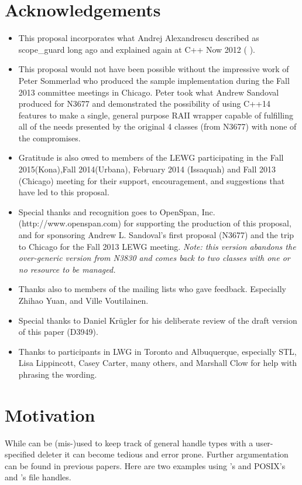 \documentclass[ebook,11pt,article]{memoir}
\begin{document}
\chapter{Acknowledgements}
\begin{itemize}
\item This proposal incorporates what Andrej Alexandrescu described as scope_guard long ago and explained again at C++ Now 2012 (%
).
\item This proposal would not have been possible without the impressive work of Peter Sommerlad who produced the sample implementation during the Fall 2013 committee meetings in Chicago.  Peter took what Andrew Sandoval produced for N3677 and demonstrated the possibility of using C++14 features to make a single, general purpose RAII wrapper capable of fulfilling all of the needs presented by the original 4 classes (from N3677) with none of the compromises.
\item Gratitude is also owed to members of the LEWG participating in the Fall 2015(Kona),Fall 2014(Urbana), February 2014 (Issaquah) and Fall 2013 (Chicago) meeting for their support, encouragement, and suggestions that have led to this proposal.
\item Special thanks and recognition goes to OpenSpan, Inc. (http://www.openspan.com) for supporting the production of this proposal, and for sponsoring Andrew L. Sandoval's first proposal (N3677) and the trip to Chicago for the Fall 2013 LEWG meeting. \emph{Note: this version abandons the over-generic version from N3830 and comes back to two classes with one or no resource to be managed.}
\item Thanks also to members of the mailing lists who gave feedback. Especially Zhihao Yuan, and Ville Voutilainen.
\item Special thanks to Daniel Kr\"ugler for his deliberate review of the draft version of this paper (D3949).
\item Thanks to participants in LWG in Toronto and Albuquerque, especially STL, Lisa Lippincott, Casey Carter, many others, and Marshall Clow for help with phrasing the wording.
\end{itemize}
\newpage
\chapter{Motivation}
While  can be (mis-)used to keep track of general handle types with a user-specified deleter it can become tedious and error prone. Further argumentation can be found in previous papers. Here are two examples using  's  and POSIX's and 's  file handles. 
\end{document}
